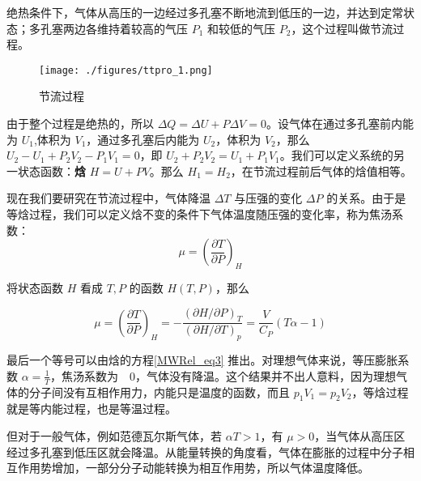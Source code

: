 

绝热条件下，气体从高压的一边经过多孔塞不断地流到低压的一边，并达到定常状态；多孔塞两边各维持着较高的气压 $P_1$ 和较低的气压 $P_2$，这个过程叫做节流过程。

\begin{figure}[ht]
\centering
\texttt{[image: ./figures/ttpro\_1.png]}
\caption{节流过程} \label{ttpro_fig1}
\end{figure}

由于整个过程是绝热的，所以 $\Delta Q=\Delta U+P\Delta V=0$。设气体在通过多孔塞前内能为 $U_1$,体积为 $V_1$，通过多孔塞后内能为 $U_2$，体积为 $V_2$，那么 $U_2-U_1+P_2V_2-P_1V_1=0$，即 $U_2+P_2V_2=U_1+P_1V_1$。我们可以定义系统的另一状态函数：\textbf{焓} $H=U+PV$。那么 $H_1=H_2$，在节流过程前后气体的焓值相等。

现在我们要研究在节流过程中，气体降温 $\Delta T$ 与压强的变化 $\Delta P$ 的关系。由于是等焓过程，我们可以定义焓不变的条件下气体温度随压强的变化率，称为焦汤系数：
\begin{equation}
\mu=\left(\frac{\partial T}{\partial P}\right)_H
\end{equation}

将状态函数 $H$ 看成 $T,P$ 的函数 $H(T,P)$，那么

\begin{equation}
\mu=\left(\frac{\partial T}{\partial P}\right)_H=
-\frac{(\partial H/\partial P)_T}{(\partial H/\partial T)_p}
=\frac{V}{C_P}(T\alpha-1)
\end{equation}

最后一个等号可以由焓的方程\autoref{MWRel_eq3} 推出。对理想气体来说，等压膨胀系数 $\alpha=\frac{1}{T}$，焦汤系数为　$0$，气体没有降温。这个结果并不出人意料，因为理想气体的分子间没有互相作用力，内能只是温度的函数，而且 $p_1V_1=p_2V_2$，等焓过程就是等内能过程，也是等温过程。

但对于一般气体，例如范德瓦尔斯气体，若 $\alpha T>1$，有 $\mu>0$，当气体从高压区经过多孔塞到低压区就会降温。从能量转换的角度看，气体在膨胀的过程中分子相互作用势增加，一部分分子动能转换为相互作用势，所以气体温度降低。